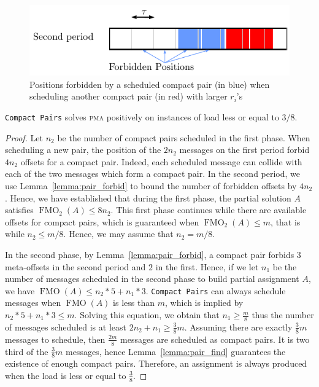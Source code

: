 \documentclass[a4paper,UKenglish,cleveref, autoref, thm-restate]{lipics-v2019}
\DeclareMathOperator{\Fmo}{FMO}
\newcommand\pma{\textsc{pma}\xspace}
\newcommand\compactpair{\texttt{Compact Pairs}\xspace}
\begin{document}
\begin{figure}
\begin{center}
\includegraphics[scale=0.7]{pairforbiden}
\end{center}

\caption{Positions forbidden by a scheduled compact pair (in blue) when scheduling another compact pair (in red) with larger $r_i$'s} 
\label{fig:forbidenmeta}
\end{figure}
\begin{theorem}
\compactpair solves \pma positively on instances of load less or equal to $3/8$.
\end{theorem}
\begin{proof}
Let $n_2$ be the number of compact pairs scheduled in the first phase. When scheduling a new pair, the position of the $2n_2$ messages on the first period forbid $4n_2$ offsets for a compact pair. Indeed, each scheduled message can collide with each of the two messages which form a compact pair. In the second period, we use Lemma~\ref{lemma:pair_forbid} to bound the number of forbidden offsets by $4n_2$. 
Hence, we have established that during the first phase, the partial solution $A$ satisfies $\Fmo_2(A) \leq 8n_2$. This first phase continues while there are available offsets for compact pairs, which is guaranteed when $\Fmo_2(A) \leq m$, that is while $n_2 \leq m/8$. Hence, we may assume that $n_2 = m/8$.

In the second phase, by Lemma~\ref{lemma:pair_forbid}, a compact pair forbids $3$ meta-offsets in the 
second period and $2$ in the first. Hence, if we let $n_1$ be the number of messages scheduled in the second phase to build partial assignment $A$, we have $\Fmo(A) \leq n_2*5 + n_1*3$. 
\compactpair can always schedule messages when $\Fmo(A)$ is less than $m$, which is implied by $n_2*5 + n_1*3 \leq m$.
Solving this equation, we obtain that $n_1 \geq \frac{m}{8}$ thus the number of messages scheduled is at least $2n_2 + n_1 \geq \frac{3}{8}m$. Assuming there are exactly $\frac{3}{8}m$ messages to schedule, then $\frac{2m}{8}$ messages are scheduled as compact pairs. It is two third of the $\frac{3}{8}m$ messages, hence Lemma~\ref{lemma:pair_find} guarantees the existence of enough compact pairs. Therefore, an assignment is always produced when the load is less or equal to $\frac{3}{8}$.
\end{proof}
\end{document}
